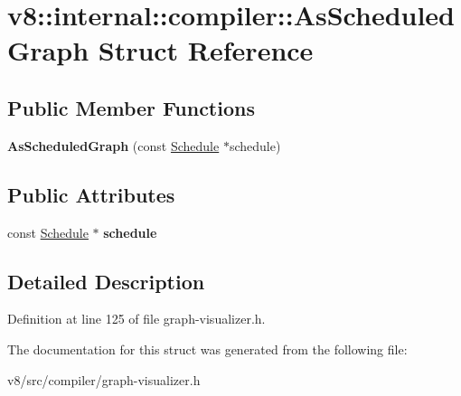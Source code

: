 \hypertarget{structv8_1_1internal_1_1compiler_1_1AsScheduledGraph}{}\section{v8\+:\+:internal\+:\+:compiler\+:\+:As\+Scheduled\+Graph Struct Reference}
\label{structv8_1_1internal_1_1compiler_1_1AsScheduledGraph}
\subsection*{Public Member Functions}
\begin{DoxyCompactItemize}
\item 
\mbox{\label{structv8_1_1internal_1_1compiler_1_1AsScheduledGraph_a44b6095e9da9ad54f6adc1497d6d268c}} 
{\bfseries As\+Scheduled\+Graph} (const \mbox{\hyperlink{classv8_1_1internal_1_1compiler_1_1Schedule}{Schedule}} $\ast$schedule)
\end{DoxyCompactItemize}
\subsection*{Public Attributes}
\begin{DoxyCompactItemize}
\item 
\mbox{\label{structv8_1_1internal_1_1compiler_1_1AsScheduledGraph_ac918175c382437b23ef2ca7d8a15ec08}} 
const \mbox{\hyperlink{classv8_1_1internal_1_1compiler_1_1Schedule}{Schedule}} $\ast$ {\bfseries schedule}
\end{DoxyCompactItemize}


\subsection{Detailed Description}


Definition at line 125 of file graph-\/visualizer.\+h.



The documentation for this struct was generated from the following file\+:\begin{DoxyCompactItemize}
\item 
v8/src/compiler/graph-\/visualizer.\+h\end{DoxyCompactItemize}
